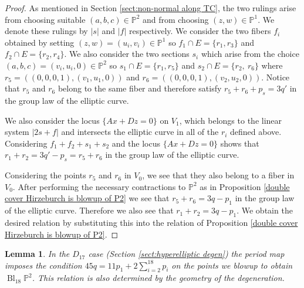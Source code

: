 \documentclass[a4paper]{amsart}
\theoremstyle{definition}
\theoremstyle{plain}
\newtheorem{lemma}[defn]{Lemma}
\theoremstyle{remark}
\newcommand{\PS}{\mathbb{P}}
\begin{document}
\begin{proof}
As mentioned in Section \ref{sect:non-normal along TC}, the two rulings arise from choosing suitable $(a,b,c)\in\PS^2$ and from choosing $(z,w)\in\PS^1$. We denote these rulings by $|s|$ and $|f|$ respectively. We consider the two fibers $f_i$ obtained by setting $(z,w)=(u_i,v_i)\in\PS^1$ so $f_1\cap E=\{r_1,r_3\}$ and $f_2\cap E=\{r_2,r_4\}$. We also consider the two sections $s_i$ which arise from the choice $(a,b,c)=(v_i,u_i,0)\in\PS^2$ so $s_1\cap E=\{r_1,r_5\}$ and $s_2\cap E=\{r_2,\ r_6\}$ where $r_5=((0,0,0,1),(v_1,u_1,0))$ and $r_6=((0,0,0,1),(v_2,u_2,0))$. Notice that $r_5$ and $r_6$ belong to the same fiber and therefore satisfy $r_5+r_6+p_s=3q'$ in the group law of the elliptic curve.

We also consider the locus $\{Ax+Dz=0\}$ on $V_1$, which belongs to the linear system $|2s+f|$ and intersects the elliptic curve in all of the $r_i$ defined above. Considering $f_1+f_2+s_1+s_2$ and the locus $\{Ax+Dz=0\}$ shows that $r_1+r_2=3q'-p_s=r_5+r_6$ in the group law of the elliptic curve. 

Considering the points $r_5$ and $r_6$ in $V_0$, we see that they also belong to a fiber in $V_0$. After performing the necessary contractions to $\PS^2$ as in Proposition \ref{double cover Hirzeburch is blowup of P2} we see that $r_5+r_6=3q-p_1$ in the group law of the elliptic curve. Therefore we also see that $r_1+r_2=3q-p_1$. We obtain the desired relation by substituting this into the relation of Proposition \ref{double cover Hirzeburch is blowup of P2}.
\end{proof}

\begin{lemma}
In the $D_{17}$ case (Section \ref{sect:hyperelliptic degen}) the period map imposes the condition $45q=11p_1+2\sum_{i=2}^{18}p_i$ on the points we blowup to obtain $\operatorname{Bl}_{18}\PS^2$. This relation is also determined by the geometry of the degeneration.
\end{lemma}
\end{document}
